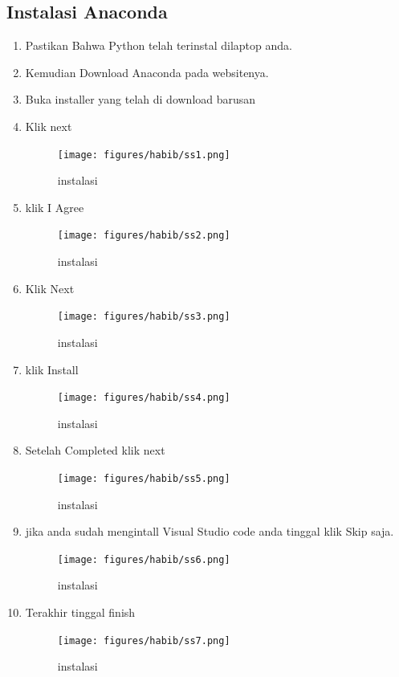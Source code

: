 \subsection{Instalasi Anaconda}
\begin{enumerate}
    \item Pastikan Bahwa Python telah terinstal dilaptop anda.
    \item Kemudian Download Anaconda pada websitenya.
    \item Buka installer yang telah di download barusan
    \item Klik next
     \begin{figure}[!htbp]
        \centering
        \texttt{[image: figures/habib/ss1.png]}
        \caption{instalasi}
        \label{instalasi}
        \end{figure}
    \item klik I Agree
    \begin{figure}[!htbp]
        \centering
        \texttt{[image: figures/habib/ss2.png]}
        \caption{instalasi}
        \label{instalasi}
        \end{figure}
    \item Klik Next
    \begin{figure}[!htbp]
        \centering
        \texttt{[image: figures/habib/ss3.png]}
        \caption{instalasi}
        \label{instalasi}
        \end{figure}
    \item klik Install
    \begin{figure}[!htbp]
        \centering
        \texttt{[image: figures/habib/ss4.png]}
        \caption{instalasi}
        \label{instalasi}
        \end{figure}
    \item Setelah Completed klik next
    \begin{figure}[!htbp]
        \centering
        \texttt{[image: figures/habib/ss5.png]}
        \caption{instalasi}
        \label{instalasi}
        \end{figure}
    \item jika anda sudah mengintall Visual Studio code anda tinggal klik Skip saja.
    \begin{figure}[!htbp]
        \centering
        \texttt{[image: figures/habib/ss6.png]}
        \caption{instalasi}
        \label{instalasi}
        \end{figure}
    \item Terakhir tinggal finish
    \begin{figure}[!htbp]
        \centering
        \texttt{[image: figures/habib/ss7.png]}
        \caption{instalasi}
        \label{instalasi}
        \end{figure}
\end{enumerate}
